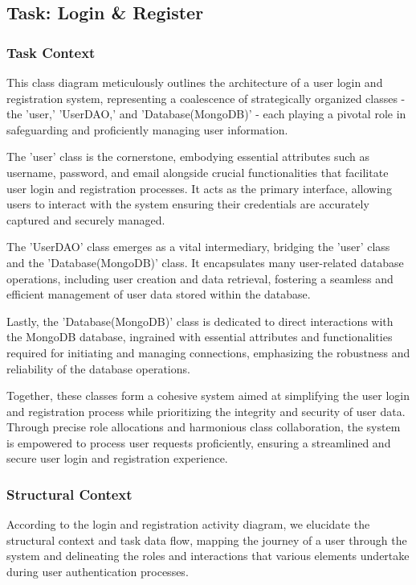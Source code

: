 \documentclass[conference]{IEEEtran}
\begin{document}
\subsection{\textbf{Task: Login \& Register }}

\subsubsection{\textbf{Task Context }}
\textbf{}

This class diagram meticulously outlines the architecture of a user login and registration system, representing a coalescence of strategically organized classes - the 'user,' 'UserDAO,' and 'Database(MongoDB)' - each playing a pivotal role in safeguarding and proficiently managing user information.

The 'user' class is the cornerstone, embodying essential attributes such as username, password, and email alongside crucial functionalities that facilitate user login and registration processes. It acts as the primary interface, allowing users to interact with the system ensuring their credentials are accurately captured and securely managed.

The 'UserDAO' class emerges as a vital intermediary, bridging the 'user' class and the 'Database(MongoDB)' class. It encapsulates many user-related database operations, including user creation and data retrieval, fostering a seamless and efficient management of user data stored within the database.

Lastly, the 'Database(MongoDB)' class is dedicated to direct interactions with the MongoDB database, ingrained with essential attributes and functionalities required for initiating and managing connections, emphasizing the robustness and reliability of the database operations.

Together, these classes form a cohesive system aimed at simplifying the user login and registration process while prioritizing the integrity and security of user data. Through precise role allocations and harmonious class collaboration, the system is empowered to process user requests proficiently, ensuring a streamlined and secure user login and registration experience.

\subsubsection{\textbf{Structural Context }}
\textbf{}

According to the login and registration activity diagram, we elucidate the structural context and task data flow, mapping the journey of a user through the system and delineating the roles and interactions that various elements undertake during user authentication processes.
\end{document}

